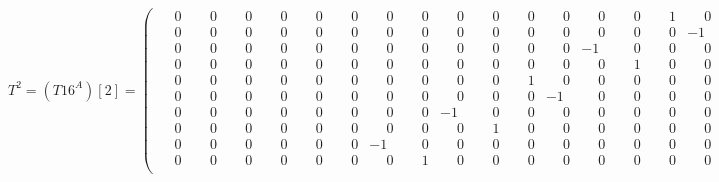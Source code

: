 \documentclass[10pt]{article}
\begin{document}
\[
T^{2} = (T16^A)[2] = \left(\begin{smallmatrix}
\phantom{-}0 & \phantom{-}0 & \phantom{-}0 & \phantom{-}0 & \phantom{-}0 & \phantom{-}0 & \phantom{-}0 & \phantom{-}0 & \phantom{-}0 & \phantom{-}0 & \phantom{-}0 & \phantom{-}0 & \phantom{-}0 & \phantom{-}0 & \phantom{-}1 & \phantom{-}0 \\
\phantom{-}0 & \phantom{-}0 & \phantom{-}0 & \phantom{-}0 & \phantom{-}0 & \phantom{-}0 & \phantom{-}0 & \phantom{-}0 & \phantom{-}0 & \phantom{-}0 & \phantom{-}0 & \phantom{-}0 & \phantom{-}0 & \phantom{-}0 & \phantom{-}0 & -1 \\
\phantom{-}0 & \phantom{-}0 & \phantom{-}0 & \phantom{-}0 & \phantom{-}0 & \phantom{-}0 & \phantom{-}0 & \phantom{-}0 & \phantom{-}0 & \phantom{-}0 & \phantom{-}0 & \phantom{-}0 & -1 & \phantom{-}0 & \phantom{-}0 & \phantom{-}0 \\
\phantom{-}0 & \phantom{-}0 & \phantom{-}0 & \phantom{-}0 & \phantom{-}0 & \phantom{-}0 & \phantom{-}0 & \phantom{-}0 & \phantom{-}0 & \phantom{-}0 & \phantom{-}0 & \phantom{-}0 & \phantom{-}0 & \phantom{-}1 & \phantom{-}0 & \phantom{-}0 \\
\phantom{-}0 & \phantom{-}0 & \phantom{-}0 & \phantom{-}0 & \phantom{-}0 & \phantom{-}0 & \phantom{-}0 & \phantom{-}0 & \phantom{-}0 & \phantom{-}0 & \phantom{-}1 & \phantom{-}0 & \phantom{-}0 & \phantom{-}0 & \phantom{-}0 & \phantom{-}0 \\
\phantom{-}0 & \phantom{-}0 & \phantom{-}0 & \phantom{-}0 & \phantom{-}0 & \phantom{-}0 & \phantom{-}0 & \phantom{-}0 & \phantom{-}0 & \phantom{-}0 & \phantom{-}0 & -1 & \phantom{-}0 & \phantom{-}0 & \phantom{-}0 & \phantom{-}0 \\
\phantom{-}0 & \phantom{-}0 & \phantom{-}0 & \phantom{-}0 & \phantom{-}0 & \phantom{-}0 & \phantom{-}0 & \phantom{-}0 & -1 & \phantom{-}0 & \phantom{-}0 & \phantom{-}0 & \phantom{-}0 & \phantom{-}0 & \phantom{-}0 & \phantom{-}0 \\
\phantom{-}0 & \phantom{-}0 & \phantom{-}0 & \phantom{-}0 & \phantom{-}0 & \phantom{-}0 & \phantom{-}0 & \phantom{-}0 & \phantom{-}0 & \phantom{-}1 & \phantom{-}0 & \phantom{-}0 & \phantom{-}0 & \phantom{-}0 & \phantom{-}0 & \phantom{-}0 \\
\phantom{-}0 & \phantom{-}0 & \phantom{-}0 & \phantom{-}0 & \phantom{-}0 & \phantom{-}0 & -1 & \phantom{-}0 & \phantom{-}0 & \phantom{-}0 & \phantom{-}0 & \phantom{-}0 & \phantom{-}0 & \phantom{-}0 & \phantom{-}0 & \phantom{-}0 \\
\phantom{-}0 & \phantom{-}0 & \phantom{-}0 & \phantom{-}0 & \phantom{-}0 & \phantom{-}0 & \phantom{-}0 & \phantom{-}1 & \phantom{-}0 & \phantom{-}0 & \phantom{-}0 & \phantom{-}0 & \phantom{-}0 & \phantom{-}0 & \phantom{-}0 & \phantom{-}0 \\

\end{smallmatrix}\]
\end{document}
